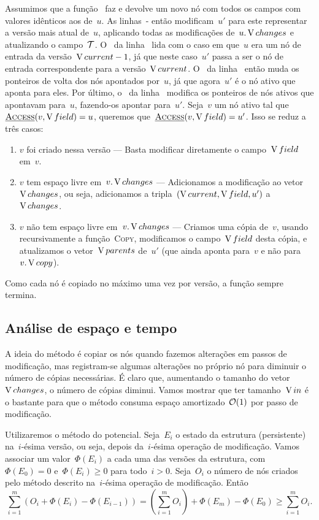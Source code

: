 \documentclass[main.tex]{subfiles}
\begin{document}
Assumimos que a função~ faz e devolve um novo nó com todos os campos com valores idênticos aos de~$u$. As linhas~- então modificam~$u'$ para este representar a versão mais atual de~$u$, aplicando todas as modificações de~$u.\operatorname{V}{changes}$ e atualizando o campo~$\mathcal{T}$. O~ da linha~ lida com o caso em que~$u$ era um nó de entrada da versão~$\operatorname{V}{current}-1$, já que neste caso~$u'$ passa a ser o nó de entrada correspondente para a versão~$\operatorname{V}{current}$. O~ da linha~ então muda os ponteiros de volta dos nós apontados por~$u$, já que agora~$u'$ é o nó ativo que aponta para eles. Por último, o~ da linha~ modifica os ponteiros de nós ativos que apontavam para~$u$, fazendo-os apontar para~$u'$. Seja~$v$ um nó ativo tal que~$\mbox{\textsc{\underline{Access}}\ensuremath{(v, \operatorname{V}{field})}} = u$, queremos que~$\mbox{\textsc{\underline{Access}}\ensuremath{(v, \operatorname{V}{field})}} = u'$. Isso se reduz a três casos:
\begin{enumerate}
\item $v$ foi criado nessa versão --- Basta modificar diretamente o campo~$\operatorname{V}{field}$ em~$v$.
\item $v$ tem espaço livre em~$v.\operatorname{V}{changes}$ --- Adicionamos a modificação ao vetor~$\operatorname{V}{changes}$, ou seja, adicionamos a tripla~$(\operatorname{V}{current}, \operatorname{V}{field}, u')$ a~$\operatorname{V}{changes}$.
\item $v$ não tem espaço livre em~$v.\operatorname{V}{changes}$ --- Criamos uma cópia de~$v$, usando recursivamente a função~\textsc{Copy}, modificamos o campo~$\operatorname{V}{field}$ desta cópia, e atualizamos o vetor~$\operatorname{V}{parents}$ de~$u'$ (que ainda aponta para~$v$ e não para~$v.\operatorname{V}{copy}$).
\end{enumerate}

Como cada nó é copiado no máximo uma vez por versão, a função sempre termina.

\subsection{Análise de espaço e tempo}

A ideia do método é copiar os nós quando fazemos alterações em passos de modificação, mas registram-se algumas alterações no próprio nó para diminuir o número de cópias necessárias. É claro que, aumentando o tamanho do vetor~$\operatorname{V}{changes}$, o número de cópias diminui. Vamos mostrar que ter tamanho~$\operatorname{V}{in}$ é o bastante para que o método consuma espaço amortizado~$\mathcal{O}(1)$ por passo de modificação.

Utilizaremos o método do potencial. Seja~$E_i$ o estado da estrutura (persistente) na~$i$-ésima versão, ou seja, depois da~$i$-ésima operação de modificação. Vamos associar um valor~$\Phi(E_i)$ a cada uma das versões da estrutura, com~$\Phi(E_0) = 0$ e~$\Phi(E_i) \geq 0$ para todo~$i > 0$. Seja~$O_i$ o número de nós criados pelo método descrito na~$i$-ésima operação de modificação. Então
$$ \sum\limits_{i=1}^{m}{\left(O_i + \Phi(E_i) - \Phi(E_{i-1})\right)} = \left(\sum\limits_{i=1}^m{O_i}\right) + \Phi(E_m) - \Phi(E_0) \geq \sum\limits_{i=1}^m{O_i}. $$
\end{document}
